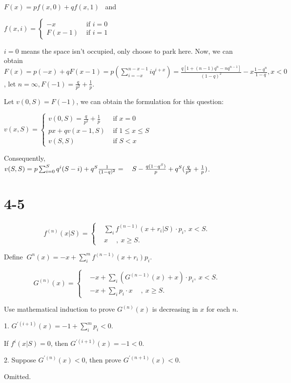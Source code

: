 \documentclass[UTF8]{article}
\begin{document}
$F(x) = pf(x,0)+qf(x,1)$ ~and

$f(x, i)=\left\{\begin{array}{ll}
-x & \text { if } i=0 \\
F(x-1) & \text { if } i=1
\end{array}\right.$

$i= 0$ means the space isn't occupied, only choose to park here.
Now, we can obtain $F(x) = p(-x)+qF(x-1) = p(\sum_{i=-x}^{n-x-1} iq^{i+x}) = \frac{q[1+(n-1)q^n-nq^{n-1}]}{(1-q)^2}-x\frac{1-q^n}{1-q}
, x<0$, let $n = \infty,F(-1) = \frac{q}{p^2}+ \frac{1}{p}$.

Let $v(0,S) = F(-1)$, we can obtain the formulation for this question:

$v(x, S)=\left\{\begin{array}{ll}v(0,S)= \frac{q}{p^2}+ \frac{1}{p} & \text { if } x=0 \\ p x+q v(x-1, S) & \text { if } 1 \leq x \leq S \\ v(S, S) & \text { if } S<x\end{array}\right.$

Consequently, $v(S,S) = p \sum_{i=0}^S q^i(S-i) + q^S\frac{1}{(1-q)^2} = \\ \quad S - \frac{q(1-q^S)}{p} + q^S (\frac{q}{p^2}+ \frac{1}{p})$.

\section*{4-5}

$$ f^{(n)}(x|S)=\left\{
\begin{aligned}
& \sum_{i} f^{(n-1)}(x+r_i|S)\cdot p_i,~ x<S.  \\
& x ~\quad, ~ x\geq S.
\end{aligned}
\right.
$$

Define $~G^n (x) = -x + \sum_i^m f^{(n-1)}(x+r_i)p_i$.

$$ G^{(n)}(x)=\left\{
\begin{aligned}
& -x + \sum_{i} (G^{(n-1)}(x)+x)\cdot p_i,~ x<S.  \\
& -x + \sum_{i} p_i \cdot x ~\quad, ~ x\geq S.
\end{aligned}
\right.
$$

Use mathematical induction to prove $G^{(n)}(x)$ is decreasing in $x$ for each $n$.

1. $G^{'(i+1)} (x) = -1 + \sum_i^m p_i < 0$.

If $f^{i}(x|S) =0$, then $G^{'(i+1)} (x) =-1<0$.

2. Suppose $G^{'(n)} (x)<0$, then prove $G^{'(n+1)} (x)< 0$.

Omitted.
\end{document}

